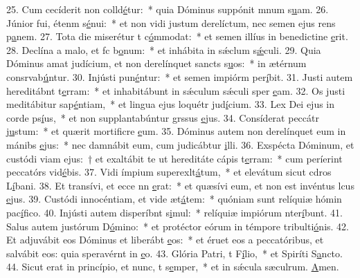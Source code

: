 25. Cum cecíderit non colld\uline{é}tur:~* quia Dóminus suppónit mnum s\uline{u}am.
26. Júnior fui, étenm s\uline{é}nui:~* et non vidi justum derelíctum, nec semen ejus rens p\uline{a}nem.
27. Tota die miserétur t c\uline{ó}mmodat:~* et semen illíus in benedictine \uline{e}rit.
28. Declína a malo, et fc b\uline{o}num:~* et inhábita in sǽclum s\uline{ǽ}culi.
29. Quia Dóminus amat judícium, et non derelínquet sancts s\uline{u}os:~* in ætérnum consrvab\uline{ú}ntur.
30. Injústi pun\uline{é}ntur:~* et semen impiórm per\uline{í}bit.
31. Justi autem hereditábnt t\uline{e}rram:~* et inhabitábunt in sǽculum sǽculi sper \uline{e}am.
32. Os justi meditábitur sap\uline{é}ntiam,~* et lingua ejus loquétr jud\uline{í}cium.
33. Lex Dei ejus in corde ps\uline{í}us,~* et non supplantabúntur grssus \uline{e}jus.
34. Consíderat peccátr j\uline{u}stum:~* et quærit mortificre \uline{e}um.
35. Dóminus autem non derelínquet eum in mánibs \uline{e}jus:~* nec damnábit eum, cum judicábtur \uline{i}lli.
36. Exspécta Dóminum, et custódi viam ejus:~† et exaltábit te ut hereditáte cápis t\uline{e}rram:~* cum períerint peccatórs vid\uline{é}bis.
37. Vidi ímpium superexlt\uline{á}tum,~* et elevátum sicut cdros L\uline{í}bani.
38. Et transívi, et ecce nn \uline{e}rat:~* et quæsívi eum, et non est invéntus lcus \uline{e}jus.
39. Custódi innocéntiam, et vide æt\uline{á}tem:~* quóniam sunt relíquiæ hómin pac\uline{í}fico.
40. Injústi autem disperíbnt s\uline{i}mul:~* relíquiæ impiórum nter\uline{í}bunt.
41. Salus autem justórum  D\uline{ó}mino:~* et protéctor eórum in témpore tribulti\uline{ó}nis.
42. Et adjuvábit eos Dóminus et liberábt \uline{e}os:~* et éruet eos a peccatóribus, et salvábit eos: quia speravérnt in \uline{e}o.
43. Glória Patri, t F\uline{í}lio,~* et Spiríti S\uline{a}ncto.
44. Sicut erat in princípio, et nunc, t s\uline{e}mper,~* et in sǽcula sæculrum. \uline{A}men.
